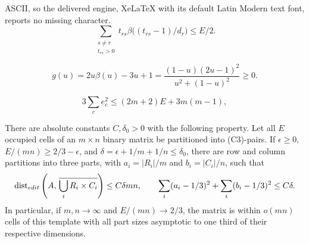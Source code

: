 \documentclass[10pt,a4paper]{amsart}
\begin{document}
ASCII, so the delivered engine, XeLaTeX with its default Latin Modern text font, reports no missing character.
\begin{equation}\label{eq:openpivot}
 \sum_{\substack{s\ne r\\t_{rs}>0}}
 t_{rs}\beta\bigl((t_{rs}-1)/d_r\bigr)\le E/2.
\end{equation}

\begin{equation}\label{eq:scalar-slack}
 g(u)=2u\beta(u)-3u+1
 =\frac{(1-u)(2u-1)^2}{u^2+(1-u)^2}\ge0.
\end{equation}

\begin{equation}\label{eq:degree-moment}
 3\sum_c e_c^2\le(2m+2)E+3m(m-1),
\end{equation}

\begin{theorem}\label{thm:phasestability}
There are absolute constants $C,\delta_0>0$ with the following property.
Let all $E$ occupied cells of an $m\times n$ binary matrix be partitioned
into (C3)-pairs. If $\epsilon\ge0$, $E/(mn)\ge2/3-\epsilon$, and
$\delta=\epsilon+1/m+1/n\le\delta_0$, there are row and column partitions
into three parts, with $a_i=|R_i|/m$ and $b_i=|C_i|/n$, such that
\[
 \operatorname{dist}_{\rm edit}
 \left(A,\,\overline{\bigcup_i R_i\times C_i}\right)\le C\delta mn,
 \qquad
 \sum_i(a_i-1/3)^2+\sum_i(b_i-1/3)^2\le C\delta.
\]
In particular, if $m,n\to\infty$ and $E/(mn)\to2/3$, the matrix is
within $o(mn)$ cells of this template with all part sizes asymptotic
to one third of their respective dimensions.
\end{theorem}
\end{document}

